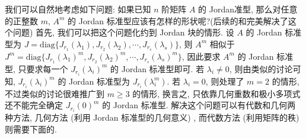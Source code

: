 \documentclass[../../main.tex]{subfiles}
\begin{document}
我们可以自然地考虑如下问题: 如果已知 $n$ 阶矩阵 $A$ 的 Jordan准型, 那么对任意的正整数 $m$, $A^m$ 的 Jordan 标准型应该有怎样的形状呢?(后续的和完美解决了这个问题) 首先, 我们可以把这个问题化约到 Jordan 块的情形. 设 $A$ 的 Jordan 标准型为 $J = \mathrm{diag}\{J_{r_1}(\lambda_1),J_{r_2}(\lambda_2),\cdots,J_{r_s}(\lambda_s)\}$, 则 $A^m$ 相似于 $J^m = \mathrm{diag}\{J_{r_1}(\lambda_1)^m,J_{r_2}(\lambda_2)^m,\cdots,J_{r_s}(\lambda_s)^m\}$, 因此要求 $A^m$ 的 Jordan 标准型, 只要求每一个 $J_{r_i}(\lambda_i)^m$ 的 Jordan 标准型即可. 若 $\lambda_i \neq 0$, 则由类似的讨论可知, $J_{r_i}(\lambda_i)^m$ 的 Jordan 标准型为 $J_{r_i}(\lambda_i^m)$. 若 $\lambda_i = 0$, 则处理了 $m = 2$ 的情形, 不过类似的讨论很难推广到 $m \geqslant  3$ 的情形, 换言之, 只依靠几何重数和极小多项式还不能完全确定 $J_{r_i}(0)^m$ 的 Jordan 标准型. 解决这个问题可以有代数和几何两种方法, 几何方法 (利用 Jordan 标准型的几何意义) , 而代数方法 (利用矩阵的秩) 则需要下面的.
\end{document}
